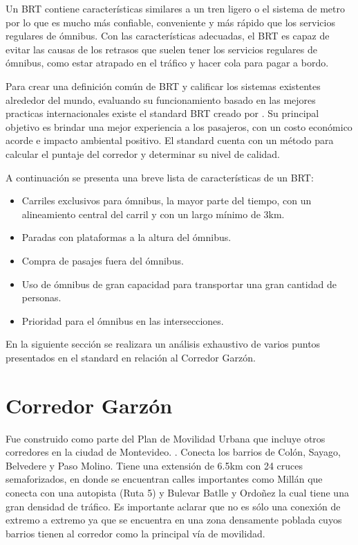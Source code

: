 Un BRT contiene características similares a un tren ligero o el sistema de metro por lo que es mucho más confiable, conveniente y más rápido que los servicios regulares de ómnibus. Con las características adecuadas, el BRT es capaz de evitar las causas de los retrasos que suelen tener los servicios regulares de ómnibus, como estar atrapado en el tráfico y hacer cola para pagar a bordo. 

Para crear una definición común de BRT y calificar los sistemas existentes alrededor del mundo,  evaluando su funcionamiento basado en las mejores practicas internacionales existe el standard BRT creado por \citet{brt_standar}. Su principal objetivo es brindar una mejor experiencia a los pasajeros, con un costo económico acorde e impacto ambiental positivo. El standard cuenta con un método para calcular el puntaje del corredor y determinar su nivel de calidad. 



A continuación se presenta una breve lista de características de un BRT:

\begin{itemize}
	\item Carriles exclusivos para ómnibus, la mayor parte del tiempo, con un alineamiento central del carril y con un largo mínimo de 3km.
	\item Paradas con plataformas a la altura del ómnibus.
	\item Compra de pasajes fuera del ómnibus.
	\item Uso de ómnibus de gran capacidad para transportar una gran cantidad de personas.
	\item Prioridad para el ómnibus en las intersecciones.
\end{itemize}

En la siguiente sección se realizara un análisis exhaustivo de varios puntos presentados en el standard en relación al Corredor Garzón.

	
\section{Corredor Garzón}	


Fue construido como parte del Plan de Movilidad Urbana que incluye otros corredores en la ciudad de Montevideo. \citep{PlanMovilidad}. Conecta los barrios de Colón, Sayago, Belvedere y Paso Molino. Tiene una extensión de 6.5km con 24 cruces semaforizados, en donde se encuentran calles importantes como Millán que conecta con una autopista (Ruta 5) y Bulevar Batlle y Ordoñez la cual tiene una gran densidad de tráfico. Es importante aclarar que no es sólo una conexión de extremo a extremo ya que se encuentra en una zona densamente poblada cuyos barrios tienen al corredor como la principal vía de movilidad.

